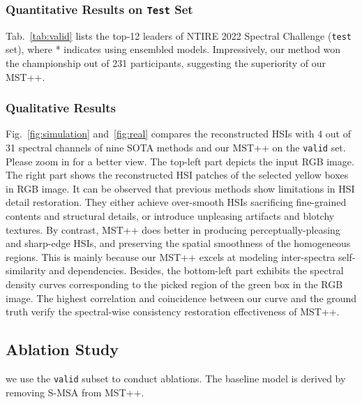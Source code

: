 \documentclass[10pt,twocolumn,letterpaper]{article}
\begin{document}
\subsubsection{Quantitative Results on \texttt{Test} Set}
Tab.~\ref{tab:valid} lists the top-12 leaders of NTIRE 2022 Spectral Challenge (\texttt{test} set), where * indicates using ensembled models.  Impressively, our method won the championship out of 231 participants, suggesting the superiority of our MST++.

\subsubsection{Qualitative Results}
Fig.~\ref{fig:simulation} and~\ref{fig:real}  compares the reconstructed HSIs with 4 out of 31 spectral channels of nine SOTA methods and our MST++ on the \texttt{valid} set. Please zoom in for a better view. The top-left part depicts the input RGB image. The right part shows the reconstructed HSI patches of the selected yellow boxes in RGB image. It can be observed that previous methods show limitations in HSI detail restoration. They either achieve over-smooth HSIs  sacrificing fine-grained contents and structural details, or introduce unpleasing artifacts and blotchy textures. By contrast, MST++ does better in producing perceptually-pleasing and sharp-edge HSIs, and preserving  the spatial smoothness of the homogeneous regions. This is mainly because our MST++ excels at modeling inter-spectra self-similarity and  dependencies. Besides, the bottom-left part exhibits the spectral density curves  corresponding to the picked region of the green box in the RGB image. The highest correlation and coincidence between our curve and the ground truth verify the spectral-wise consistency restoration effectiveness of  MST++.

\subsection{Ablation Study}
we use the \texttt{valid} subset to conduct ablations. The baseline model is derived by removing S-MSA from  MST++.
\end{document}
